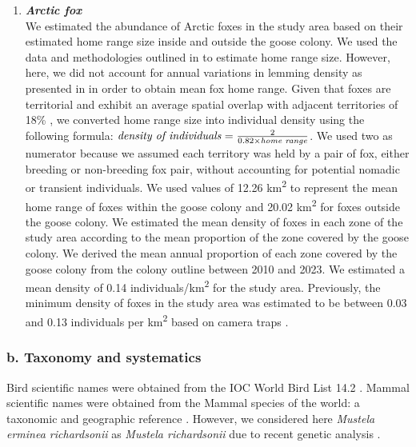 \documentclass[a4paper,twoside,12pt]{article}
\begin{document}
\begin{enumerate}[label=\alph*.]
        	\item[] \textit{\textbf{Arctic fox}}\\
        	We estimated the abundance of Arctic foxes in the study area based on their estimated home range size inside and outside the goose colony. We used the data and methodologies outlined in \citet{dulude2023} to estimate home range size. However, here, we did not account for annual variations in lemming density as presented in \citet{dulude2023} in order to obtain mean fox home range. Given that foxes are territorial and exhibit an average spatial overlap with adjacent territories of 18\% \citep{clermont2021}, we converted home range size into individual density using the following formula: $\text{\textit{density of individuals}}= \frac{2}{0.82\times \text{\textit{home range}}}$. We used two as numerator because we assumed each territory was held by a pair of fox, either breeding or non-breeding fox pair, without accounting for potential nomadic or transient individuals. We used values of 12.26 km\textsuperscript{2} to represent the mean home range of foxes within the goose colony and 20.02 km\textsuperscript{2} for foxes outside the goose colony. We estimated the mean density of foxes in each zone of the study area according to the mean proportion of the zone covered by the goose colony. We derived the mean annual proportion of each zone covered by the goose colony from the colony outline between 2010 and 2023. We estimated a mean density of 0.14 individuals/km\textsuperscript{2} for the study area. Previously, the minimum density of foxes in the study area was estimated to be between 0.03 and 0.13 individuals per km\textsuperscript{2} based on camera traps \citep{royerboutin2015}. 
		\newpage
        		\end{enumerate}
        		
\begin{landscape}

\end{landscape}
\restoregeometry
\newpage
        		
        		\subsubsection*{b. Taxonomy and systematics}
       Bird scientific names were obtained from the IOC World Bird List 14.2 \citep{gill2024}. Mammal scientific names were obtained from the Mammal species of the world: a taxonomic and geographic reference \citep{wilson2005}. However, we considered here \textit{Mustela erminea richardsonii} as \textit{Mustela richardsonii} due to recent genetic analysis \citep{colella2021}.
        		
\end{document}
